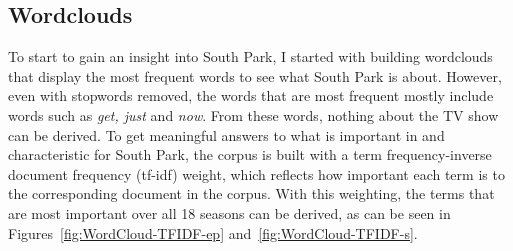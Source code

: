 \documentclass[10pt,a4paper]{article}
\begin{document}
	\subsection{Wordclouds}
	To start to gain an insight into South Park, I started with building wordclouds that display the most frequent words to see what South Park is about. However, even with stopwords removed, the words that are most frequent mostly include words such as \textit{get, just} and \textit{now}. From these words, nothing about the TV show can be derived. To get meaningful answers to what is important in and characteristic for South Park, the corpus is built with a term frequency-inverse document frequency (tf-idf) weight, which reflects how important each term is to the corresponding document in the corpus.
	With this weighting, the terms that are most important over all 18 seasons can be derived, as can be seen in Figures~\ref{fig:WordCloud-TFIDF-ep} and~\ref{fig:WordCloud-TFIDF-s}.
\end{document}
